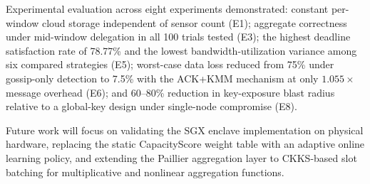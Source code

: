 \documentclass[conference]{IEEEtran}
\begin{document}
    Experimental evaluation across eight experiments demonstrated: constant per-window cloud storage independent of sensor count (E1); aggregate correctness under mid-window delegation in all 100 trials tested (E3); the highest deadline satisfaction rate of 78.77\% and the lowest bandwidth-utilization variance among six compared strategies (E5); worst-case data loss reduced from 75\% under gossip-only detection to 7.5\% with the ACK+KMM mechanism at only $1.055\times$ message overhead (E6); and 60--80\% reduction in key-exposure blast radius relative to a global-key design under single-node compromise (E8).

    Future work will focus on validating the SGX enclave implementation on physical hardware, replacing the static CapacityScore weight table with an adaptive online learning policy, and extending the Paillier aggregation layer to CKKS-based slot batching for multiplicative and nonlinear aggregation functions.

    
    

    
\end{document}
